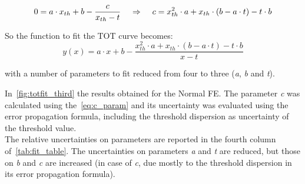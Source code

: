 \begin{equation}
0 = a\cdot x_{th} + b - \frac{c}{x_{th}-t}  \hspace{.4cm}	\Rightarrow  \hspace{.4cm}	c = x_{th}^{2}\cdot a + x_{th}\cdot (b-a\cdot t) - t\cdot b
\label{eq:c_param}
\end{equation}

\medskip
So the function to fit the TOT curve becomes:
\begin{equation}
y(x) = a\cdot x +b -\frac{x_{th}^{2}\cdot a + x_{th}\cdot (b-a\cdot t) - t\cdot b}{x-t}
\label{eq:fit_function2}
\end{equation}

with a number of parameters to fit reduced from four to three (\textit{a}, \textit{b} and \textit{t}).

In~\autoref{fig:totfit_third} the results obtained for the Normal FE. The parameter \textit{c} was calculated using the~\autoref{eq:c_param} and its uncertainty was evaluated using the error propagation formula, including the threshold dispersion as uncertainty of the threshold value.\\

The relative uncertainties on parameters are reported in the fourth column of~\autoref{tab:fit_table}. The uncertainties on parameters \textit{a} and \textit{t} are reduced, but those on \textit{b} and \textit{c} are increased (in case of \textit{c}, due mostly to the threshold dispersion in its error propagation formula).


